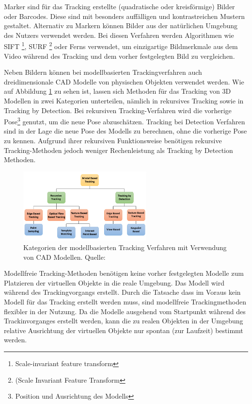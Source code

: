 Marker sind für das Tracking erstellte (quadratische oder kreisförmige) Bilder oder Barcodes. Diese sind mit besonders auffälligen und kontrastreichen Mustern gestaltet. Alternativ zu Markern können Bilder aus der natürlichen Umgebung des Nutzers verwendet werden.\cite{Cukovic2015} Bei diesen Verfahren werden Algorithmen wie SIFT \footnote{Scale-invariant feature transform}, SURF \footnote{(Scale Invariant Feature Transform} oder Ferns verwendet, um einzigartige Bildmerkmale aus dem Video während des Tracking und dem vorher festgelegten Bild zu vergleichen.

Neben Bildern können bei modellbasierten Trackingverfahren auch dreidimensionale CAD Modelle von physischen Objekten verwendet werden. \cite{Lowney2016} Wie auf Abbildung \ref{img:modellbased_categories} zu sehen ist, lassen sich Methoden für das Tracking von 3D Modellen in zwei Kategorien unterteilen, nämlich in rekursives Tracking sowie in Tracking by Detection. Bei rekursiven Tracking-Verfahren wird die vorherige Pose\footnote{Position und Ausrichtung des Modells} genutzt, um die neue Pose abzuschätzen. Tracking bei Detection Verfahren sind in der Lage die neue Pose des Modells zu berechnen, ohne die vorherige Pose zu kennen. Aufgrund ihrer rekursiven 
Funktionsweise benötigen rekursive Tracking-Methoden jedoch weniger Rechenleistung als Tracking by Detection Methoden. 

\begin{figure}[H]
	\centering
	\includegraphics[width=0.6\textwidth]{resources/fundamentals/model_based_tracking_taxonomies.png}
	\caption{Kategorien der modellbasierten Tracking Verfahren mit Verwendung von CAD Modellen. Quelle: \cite[S.~86]{Lowney2016}}
	\label{img:modellbased_categories}
\end{figure} 

Modellfreie Tracking-Methoden benötigen keine vorher festgelegten Modelle zum Platzieren der virtuellen Objekte in die reale Umgebung. \cite[S.~106]{DieterSchmalstieg2016} Das Modell wird während des Trackingvorgangs 
erstellt. Durch die Tatsache dass im Voraus kein Modell für das Tracking erstellt werden muss, sind modellfreie Trackingmethoden flexibler in der Nutzung. Da die Modelle ausgehend vom Startpunkt während des Trackinvorganges 
erstellt werden, kann die zu realen Objekten in der Umgebung relative Ausrichtung der virtuellen Objekte nur spontan (zur Laufzeit) bestimmt werden. 

